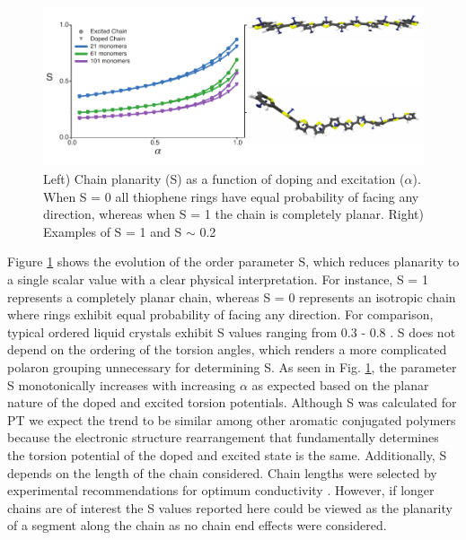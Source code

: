 \begin{figure}
    \centering
    \includegraphics{figures/chap2/S.pdf}
    \caption[Doped and Excited Chain Planarity]{Left) Chain planarity (S) as a function of doping and excitation ($\alpha$). When S = 0 all thiophene rings have equal probability of facing any direction, whereas when S = 1 the chain is completely planar. Right) Examples of S = 1 and S $\sim$ 0.2}
    \label{fig:s_order}
\end{figure}

Figure \ref{fig:s_order} shows the evolution of the order parameter S, which reduces planarity to a single scalar value with a clear physical interpretation. For instance, S = 1 represents a completely planar chain, whereas S = 0 represents an isotropic chain where rings exhibit equal probability of facing any direction. For comparison, typical ordered liquid crystals exhibit S values ranging from 0.3 - 0.8 \cite{Colfen2008}. S does not depend on the ordering of the torsion angles, which renders a more complicated polaron grouping unnecessary for determining S. As seen in Fig. \ref{fig:s_order}, the parameter S monotonically increases with increasing $\alpha$ as expected based on the planar nature of the doped and excited torsion potentials. Although S was calculated for PT we expect the trend to be similar among other aromatic conjugated polymers because the electronic structure rearrangement that fundamentally determines the torsion potential of the doped and excited state is the same. Additionally, S depends on the length of the chain considered. Chain lengths were selected by experimental recommendations for optimum conductivity \cite{Noriega2013}. However, if longer chains are of interest the S values reported here could be viewed as the planarity of a segment along the chain as no chain end effects were considered.

